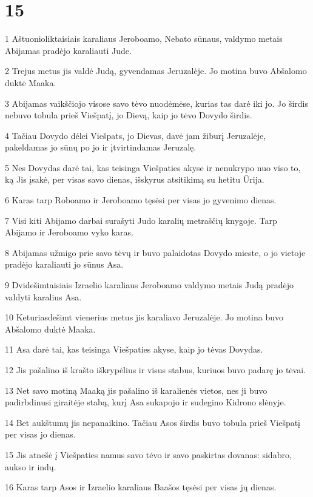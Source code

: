 \chapter{15}


\par 1 Aštuonioliktaisiais karaliaus Jeroboamo, Nebato sūnaus, valdymo metais Abijamas pradėjo karaliauti Jude. 
\par 2 Trejus metus jis valdė Judą, gyvendamas Jeruzalėje. Jo motina buvo Abšalomo duktė Maaka. 
\par 3 Abijamas vaikščiojo visose savo tėvo nuodėmėse, kurias tas darė iki jo. Jo širdis nebuvo tobula prieš Viešpatį, jo Dievą, kaip jo tėvo Dovydo širdis. 
\par 4 Tačiau Dovydo dėlei Viešpats, jo Dievas, davė jam žiburį Jeruzalėje, pakeldamas jo sūnų po jo ir įtvirtindamas Jeruzalę. 
\par 5 Nes Dovydas darė tai, kas teisinga Viešpaties akyse ir nenukrypo nuo viso to, ką Jis įsakė, per visas savo dienas, išskyrus atsitikimą su hetitu Ūrija. 
\par 6 Karas tarp Roboamo ir Jeroboamo tęsėsi per visas jo gyvenimo dienas. 
\par 7 Visi kiti Abijamo darbai surašyti Judo karalių metraščių knygoje. Tarp Abijamo ir Jeroboamo vyko karas. 
\par 8 Abijamas užmigo prie savo tėvų ir buvo palaidotas Dovydo mieste, o jo vietoje pradėjo karaliauti jo sūnus Asa. 
\par 9 Dvidešimtaisiais Izraelio karaliaus Jeroboamo valdymo metais Judą pradėjo valdyti karalius Asa. 
\par 10 Keturiasdešimt vienerius metus jis karaliavo Jeruzalėje. Jo motina buvo Abšalomo duktė Maaka. 
\par 11 Asa darė tai, kas teisinga Viešpaties akyse, kaip jo tėvas Dovydas. 
\par 12 Jis pašalino iš krašto iškrypėlius ir visus stabus, kuriuos buvo padarę jo tėvai. 
\par 13 Net savo motiną Maaką jis pašalino iš karalienės vietos, nes ji buvo padirbdinusi giraitėje stabą, kurį Asa sukapojo ir sudegino Kidrono slėnyje. 
\par 14 Bet aukštumų jis nepanaikino. Tačiau Asos širdis buvo tobula prieš Viešpatį per visas jo dienas. 
\par 15 Jis atnešė į Viešpaties namus savo tėvo ir savo paskirtas dovanas: sidabro, aukso ir indų. 
\par 16 Karas tarp Asos ir Izraelio karaliaus Baašos tęsėsi per visas jų dienas. 
